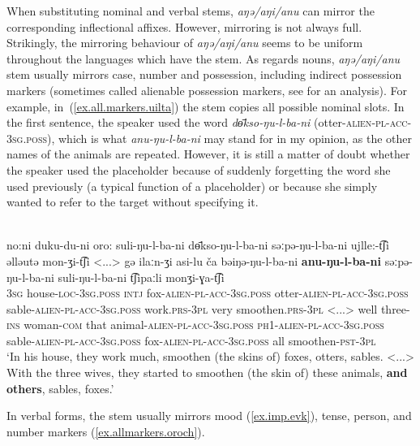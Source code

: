 \documentclass[output=paper,colorlinks,citecolor=brown
\ChapterDOI{10.5281/zenodo.15697577}
]{langscibook}
\begin{document}
When substituting nominal and verbal stems, \textit{aŋə/aŋi/anu} can mirror the corresponding inflectional affixes. However, mirroring is not always full. Strikingly, the mirroring behaviour of \textit{aŋə/aŋi/anu} seems to be uniform throughout the languages which have the stem. As regards nouns, \textit{aŋə/aŋi/anu} stem usually mirrors case, number and possession, including indirect possession markers (sometimes called alienable possession markers, see \citet{AralovaPakendorf+2023+1563+1592} for an analysis). For example, in~(\ref{ex.all.markers.uilta}) the stem copies all possible nominal slots. In the first sentence, the speaker used the word \textit{dɵ̄kso-ŋu-l-ba-ni} (otter-\textsc{alien}-\textsc{pl}-\textsc{acc}-\textsc{3sg.poss}), which is what \textit{anu-ŋu-l-ba-ni} may stand for in my opinion, as the other names of the animals are repeated. However, it is still a matter of doubt whether the speaker used the placeholder because of suddenly forgetting the word she used previously (a typical function of a placeholder) or because she simply wanted to refer to the target without specifying it.


 \ea 
 \label{ex.all.markers.uilta}
 \\
 \gll no:ni duku-du-ni oro: suli-ŋu-l-ba-ni dɵ̄kso-ŋu-l-ba-ni səːpə-ŋu-l-ba-ni ujlle:-t͡ʃi əlləutə mon-ʒi-t͡ʃi <...> gə ilaːn-ʒi asi-lu ča bəiŋə-ŋu-l-ba-ni \textbf{anu-ŋu-l-ba-ni} səːpə-ŋu-l-ba-ni suli-ŋu-l-ba-ni t͡ʃipaːli monʒi-ɣa-t͡ʃi\\
\textsc{3sg} house-\textsc{loc}-\textsc{3sg.poss} \textsc{intj} fox-\textsc{alien}-\textsc{pl}-\textsc{acc}-\textsc{3sg.poss} otter-\textsc{alien}-\textsc{pl}-\textsc{acc}-\textsc{3sg.poss} sable-\textsc{alien}-\textsc{pl}-\textsc{acc}-\textsc{3sg.poss} work.\textsc{prs}-\textsc{3pl} very smoothen.\textsc{prs}-\textsc{3pl} <...>
well three-\textsc{ins} woman-\textsc{com} that animal-\textsc{alien}-\textsc{pl}-\textsc{acc}-\textsc{3sg.poss} \textsc{ph1}-\textsc{alien}-\textsc{pl}-\textsc{acc}-\textsc{3sg.poss} sable-\textsc{alien}-\textsc{pl}-\textsc{acc}-\textsc{3sg.poss} fox-\textsc{alien}-\textsc{pl}-\textsc{acc}-\textsc{3sg.poss} all smoothen-\textsc{pst}-\textsc{3pl}\\
 \glt `In his house, they work much, smoothen (the skins of) foxes, otters, sables. <...> With the three wives, they started to smoothen (the skin of) these animals, \textbf{and others}, sables, foxes.'
\z
{} 

In verbal forms, the stem usually mirrors mood (\ref{ex.imp.evk}), tense, person, and number markers (\ref{ex.allmarkers.oroch}). 
\end{document}

